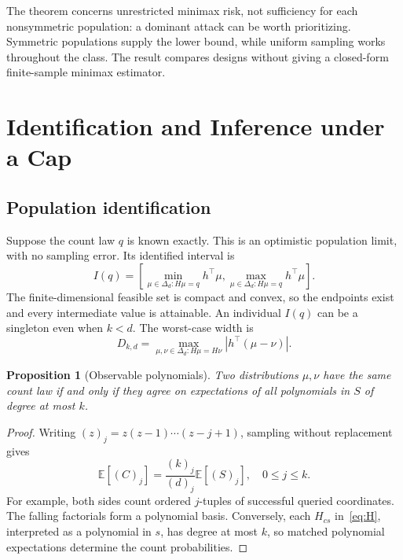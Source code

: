 \documentclass[conference]{IEEEtran}
\newtheorem{proposition}[theorem]{Proposition}
\newcommand{\E}{\mathbb{E}}
\newcommand{\simplex}{\Delta_d}
\begin{document}
The theorem concerns unrestricted minimax risk, not sufficiency for each nonsymmetric population: a dominant attack can be worth prioritizing. Symmetric populations supply the lower bound, while uniform sampling works throughout the class. The result compares designs without giving a closed-form finite-sample minimax estimator.

\section{Identification and Inference under a Cap}\label{sec:identification}
\subsection{Population identification}
Suppose the count law $q$ is known exactly. This is an optimistic population limit, with no sampling error. Its identified interval is
\begin{equation}\label{eq:identified}
 I(q)=\left[\min_{\mu\in\simplex:H\mu=q}h^\top\mu,
              \max_{\mu\in\simplex:H\mu=q}h^\top\mu\right].
\end{equation}
The finite-dimensional feasible set is compact and convex, so the endpoints exist and every intermediate value is attainable. An individual $I(q)$ can be a singleton even when $k<d$. The worst-case width is
\begin{equation}\label{eq:D}
 D_{k,d}=\max_{\mu,\nu\in\simplex:H\mu=H\nu}
 \left|h^\top(\mu-\nu)\right|.
\end{equation}

\begin{proposition}[Observable polynomials]\label{prop:moments}
Two distributions $\mu,\nu$ have the same count law if and only if they agree on expectations of all polynomials in $S$ of degree at most $k$.
\end{proposition}
\begin{proof}
Writing $(z)_j=z(z-1)\cdots(z-j+1)$, sampling without replacement gives
\begin{equation}\label{eq:factorial}
 \E[(C)_j]=\frac{(k)_j}{(d)_j}\E[(S)_j],\quad 0\leq j\leq k.
\end{equation}
For example, both sides count ordered $j$-tuples of successful queried coordinates. The falling factorials form a polynomial basis. Conversely, each $H_{cs}$ in~\eqref{eq:H}, interpreted as a polynomial in $s$, has degree at most $k$, so matched polynomial expectations determine the count probabilities.
\end{proof}
\end{document}
